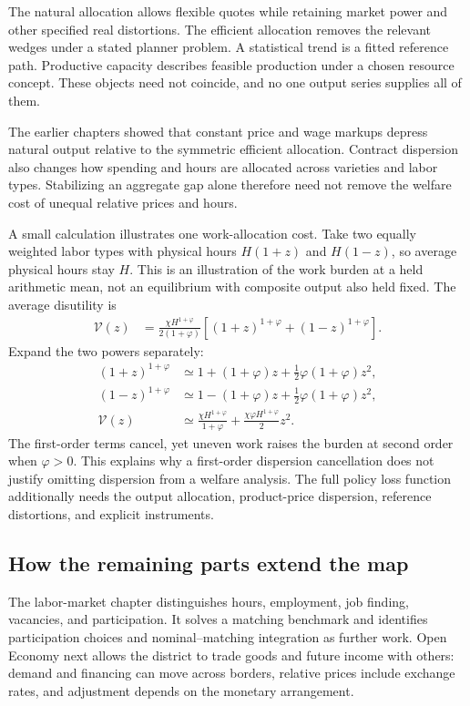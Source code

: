 The natural allocation allows flexible quotes while retaining market power
and other specified real distortions. The efficient allocation removes the
relevant wedges under a stated planner problem. A statistical trend is a fitted
reference path. Productive capacity describes feasible production under a
chosen resource concept. These objects need not coincide, and no one output
series supplies all of them.

The earlier chapters showed that constant price and wage markups depress
natural output relative to the symmetric efficient allocation. Contract dispersion
also changes how spending and hours are allocated across varieties and labor
types. Stabilizing an aggregate gap alone therefore need not remove the
welfare cost of unequal relative prices and hours.

A small calculation illustrates one work-allocation cost. Take two equally
weighted labor types with physical hours $H(1+z)$ and $H(1-z)$, so average
physical hours stay $H$. This is an illustration of the work burden at a held
arithmetic mean, not an equilibrium with composite output also held fixed.
The average disutility is
\begin{align}
 \mathcal V(z)&=\frac{\chi H^{1+\varphi}}{2(1+\varphi)}
                       [(1+z)^{1+\varphi}+(1-z)^{1+\varphi}].
\end{align}
Expand the two powers separately:
\begin{align}
 (1+z)^{1+\varphi}
 &\simeq1+(1+\varphi)z+\tfrac12\varphi(1+\varphi)z^2,\\
 (1-z)^{1+\varphi}
 &\simeq1-(1+\varphi)z+\tfrac12\varphi(1+\varphi)z^2,\\
 \mathcal V(z)
 &\simeq\frac{\chi H^{1+\varphi}}{1+\varphi}
                       +\frac{\chi\varphi H^{1+\varphi}}2 z^2.
\end{align}
The first-order terms cancel, yet uneven work raises the burden at second
order when $\varphi>0$. This explains why a first-order dispersion cancellation
does not justify omitting dispersion from a welfare analysis. The full policy
loss function additionally needs the output allocation, product-price dispersion,
reference distortions, and explicit instruments.

\subsection{How the remaining parts extend the map}

The labor-market chapter distinguishes hours, employment, job finding,
vacancies, and participation. It solves a matching benchmark and identifies
participation choices and nominal--matching integration as further work.
Open Economy next allows the district to
trade goods and future income with others: demand and financing can move
across borders, relative prices include exchange rates, and adjustment depends
on the monetary arrangement.

